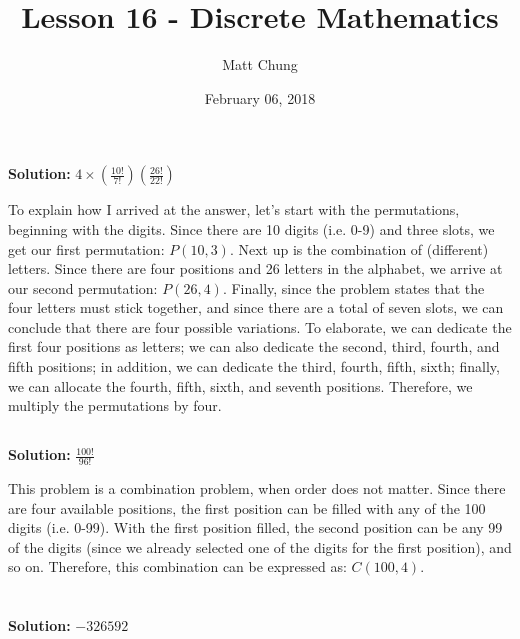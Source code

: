 \documentclass{article}
\title{Lesson 16 - Discrete Mathematics}
\author{Matt Chung}
\date{February 06, 2018}
\begin{document}
\maketitle

\section{}

\subsection{}

\textbf{Solution: }$4 \times (\frac{10!}{7!})(\frac{26!}{22!})$

To explain how I arrived at the answer, let's start with the permutations, beginning with the digits. Since there are 10 digits (i.e. 0-9) and three slots, we get our first permutation: $P(10,3)$. Next up is the combination of (different) letters. Since there are four positions and 26 letters in the alphabet, we arrive at our second permutation: $P(26, 4)$.  Finally, since the problem states that the four letters must stick together, and since there are a total of seven slots, we can conclude that there are four possible variations. To elaborate, we can dedicate the first four positions as letters; we can also dedicate the second, third, fourth, and fifth positions; in addition, we can dedicate the third, fourth, fifth, sixth; finally, we can allocate the fourth, fifth, sixth, and seventh positions. Therefore, we multiply the permutations by four.

\subsection{}

\textbf{Solution: } $\frac{100!}{96!}$

This problem is a combination problem, when order does not matter. Since there are four available positions, the first position can be filled with any of the 100 digits (i.e. 0-99). With the first position filled, the second position can be any 99 of the digits (since we already selected one of the digits for the first position), and so on. Therefore, this combination can be expressed as: $C(100, 4)$.

\section{}

\textbf{Solution: } $-326592$
\end{document}
